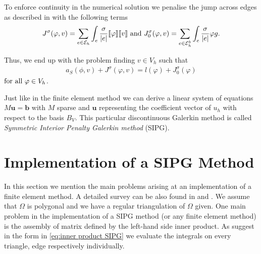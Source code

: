 
To enforce continuity in the numerical solution we penalise the jump across edges as described in  \cite[3.2.2.]{PPO+2000} with the following terms
\begin{align}
	J^\sigma(\varphi, v) = \sum\limits_{e \in \mathcal{E}_h} \int_e \frac \sigma {|e|} \llbracket \varphi \rrbracket \llbracket v \rrbracket \textnormal{ and } 	J^\sigma_0(\varphi, v) = \sum\limits_{e \in \mathcal{E}_h^b} \int_e \frac \sigma {|e|} \varphi g .
\end{align}

Thus, we end up with the problem finding $v \in V_h$ such that
\begin{align}
	a_S(\phi,v) + J^\sigma(\varphi,v) = l(\varphi) + J^\sigma_0(\varphi) \label{eq: DG system}
\end{align}
$  \textnormal{for all } \varphi \in V_h$. 

Just like in the finite element method we can derive a linear system of equations $M \mathbf{u} = \mathbf{b}$ with $M$ sparse and $\mathbf{u}$ representing the coefficient vector of $u_h$ with respect to the basis $B_V$.
This particular discontinuous Galerkin method is called \emph{Symmetric Interior Penalty Galerkin method} (SIPG).



\section{Implementation of a SIPG Method}

In this section we mention the main problems arising at an implementation of a finite element method. A detailed survey can be also found in \cite[Section 0.6]{BS2002} and \cite[Chapter 8]{Braess2003}.
We assume that $\Omega$ is polygonal and we have a regular triangulation of $\Omega$ given. One main problem in the implementation of a SIPG method (or any finite element method) is the assembly of matrix defined by the left-hand side inner product. As suggest in the form in \eqref{eq:inner product SIPG} we evaluate the integrals on every triangle, edge respectively individually.

